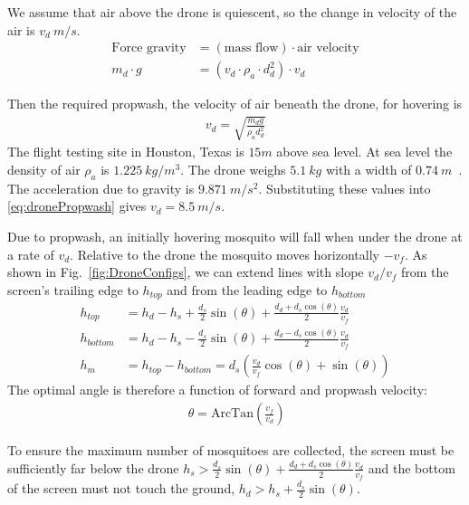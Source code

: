 \documentclass[letterpaper, 10 pt, conference]{ieeeconf}  %
\begin{document}
We assume that air above the drone is quiescent, so the change in velocity of the air is $v_d~ m/s$.
 \begin{align} \label{eq:forceBalanceForDrone}
 \text{Force gravity} & = \left(\text{mass flow}\right) \cdot \text{air velocity} \nonumber \\
 m_{d} \cdot  g &= (v_d \cdot  \rho_a \cdot  d_d^2 ) \cdot  v_d 
\end{align}

Then the required propwash, the velocity of air beneath the drone, for hovering is
 \begin{align} \label{eq:dronePropwash}
v_d = \sqrt{ \frac{ m_d g}{\rho_a d_d^2} }
\end{align}
The flight testing site in Houston, Texas is $15 m$ above sea level. At sea level the density of air $\rho_a$ is $1.225~ kg/m^3$.
The drone weighs $5.1~ kg$ with a width of $0.74~ m$~\cite{Sollenberger2015}. The acceleration due to gravity is $9.871~ m/s^2$.  Substituting these values into \eqref{eq:dronePropwash} gives $v_d = 8.5~ m/s$.

Due to propwash, an initially hovering mosquito will fall when under the drone at a rate of $v_d$.  Relative to the drone the mosquito moves horizontally $-v_f$.  As shown in Fig.~\ref{fig:DroneConfigs}, we can extend lines with slope $v_d/v_f$ from the screen's trailing edge to $h_{top}$ and from the leading edge to $h_{bottom}$
 \begin{align} \label{eq:ClearedCrossSection}
h_{top} &= h_d - h_s + \frac{d_s}{2} \sin(\theta) +  \frac{d_d + d_s\cos(\theta)}{2}  \frac{v_d}{v_f} \nonumber \\
h_{bottom} &= h_d - h_s - \frac{d_s}{2} \sin(\theta) +  \frac{d_d - d_s\cos(\theta)}{2}  \frac{v_d}{v_f}  \nonumber \\
h_m &= h_{top} - h_{bottom} =  d_s\left(\frac{v_d}{v_f}\cos(\theta) + \sin(\theta) \right)
\end{align}
The optimal angle is therefore a function of forward and propwash velocity:
\begin{align} \label{eq:OptimalScreenAngle}
\ \theta = \mathrm{ArcTan}\left(\frac{v_f}{v_d}\right)
\end{align}

To ensure the maximum number of mosquitoes are collected, the screen must be sufficiently far below the drone $ h_s > \frac{d_s}{2} \sin(\theta) +  \frac{d_d + d_s\cos(\theta)}{2}  \frac{v_d}{v_f}$  and the bottom of the screen must not touch the ground, $ h_d > h_s + \frac{d_s}{2} \sin(\theta) $.
\end{document}
